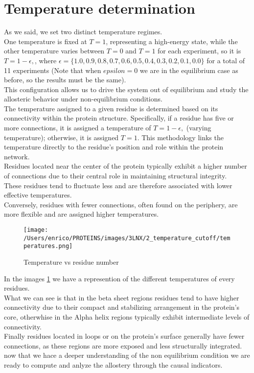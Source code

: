 \documentclass[English, Lau, oneside]{sapthesis}
\begin{document}
\section{Temperature determination}
\noindent As we said, we set two distinct temperature regimes.\\
One temperature is fixed at \( T = 1 \), representing a high-energy state, while the other temperature varies between \( T = 0 \) and \( T = 1 \) for each experiment, so it is \( T = 1 - \epsilon,\),
where \( \epsilon = \{1.0, 0.9, 0.8, 0.7, 0.6, 0.5, 0.4, 0.3, 0.2, 0.1, 0.0\} \) for a total of 11 experiments (Note that when  \( epsilon = 0 \) we are in the equilibrium case as before, so the results must be the same).\\
This configuration allows us to drive the system out of equilibrium and study the allosteric behavior under non-equilibrium conditions.\\
The temperature assigned to a given residue is determined based on its connectivity within the protein structure. Specifically, if a residue has five or more connections, it is assigned a temperature of \( T = 1 - \epsilon,\)  (varying temperature);
otherwise, it is assigned \( T = 1 \). This methodology links the temperature directly to the residue's position and role within the protein network.\\
Residues located near the center of the protein typically exhibit a higher number of connections due to their central role in maintaining structural integrity.\\
These residues tend to fluctuate less and are therefore associated with lower effective temperatures. \\
Conversely, residues with fewer connections, often found on the periphery, are more flexible and are assigned higher temperatures.\\
\begin{figure}[h!]
    \centering
    \texttt{[image: /Users/enrico/PROTEINS/images/3LNX/2\_temperature\_cutoff/temperatures.png]}
    \caption{Temperature vs residue number}
    \label{fig:Temperature vs residue number}

\end{figure}
In the images \ref{fig:Temperature vs residue number} we have a represention of the different temperatures of every residues.\\
What we can see is that in the beta sheet regions residues tend to have higher connectivity due to their compact and stabilizing arrangement in the protein's core, otherwhise in the Alpha helix regions typically exhibit intermediate levels of connectivity.\\
Finally residues located in loops or on the protein's surface generally have fewer connections, as these regions are more exposed and less structurally integrated.\\
now that we hace a deeper understanding of the non equilibrium condition we are ready to compute and anlyze the allostery through the causal indicators.\\
\end{document}
